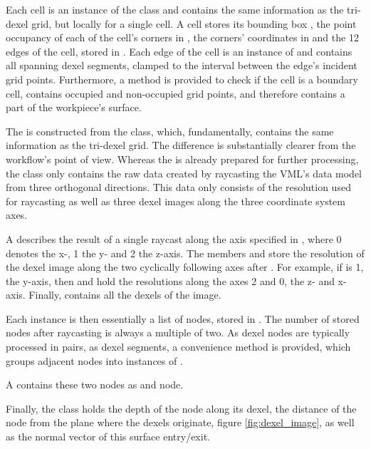Each cell is an instance of the  class and contains the same information as the tri-dexel grid, but locally for a single cell.
A cell stores its bounding box , the point occupancy of each of the cell's corners in , the corners' coordinates in  and the 12 edges of the cell, stored in .
Each edge of the cell is an instance of  and contains all spanning dexel segments, clamped to the interval between the edge's incident grid points.
Furthermore, a method  is provided to check if the cell is a boundary cell, \ie contains occupied and non-occupied grid points, and therefore contains a part of the workpiece's surface.

The  is constructed from the  class, which, fundamentally, contains the same information as the tri-dexel grid.
The difference is substantially clearer from the workflow's point of view.
Whereas the  is already prepared for further processing, the  class only contains the raw data created by raycasting the VML's data model from three orthogonal directions.
This data only consists of the resolution  used for raycasting as well as three dexel images  along the three coordinate system axes.

A  describes the result of a single raycast along the axis specified in , where 0 denotes the x-, 1 the y- and 2 the z-axis.
The members  and  store the resolution of the dexel image along the two cyclically following axes after .
For example, if  is 1, the y-axis, then  and  hold the resolutions along the axes 2 and 0, the z- and x-axis.
Finally,  contains all the dexels of the image.

Each  instance is then essentially a list of nodes, stored in .
The number of stored nodes after raycasting is always a multiple of two.
As dexel nodes are typically processed in pairs, as dexel segments, a convenience method  is provided, which groups adjacent nodes into instances of .

A  contains these two nodes as  and  node.

Finally, the  class holds the depth of the node along its dexel, \ie the distance of the node from the plane where the dexels originate, \cf figure \ref{fig:dexel_image}, as well as the normal vector of this surface entry/exit.

